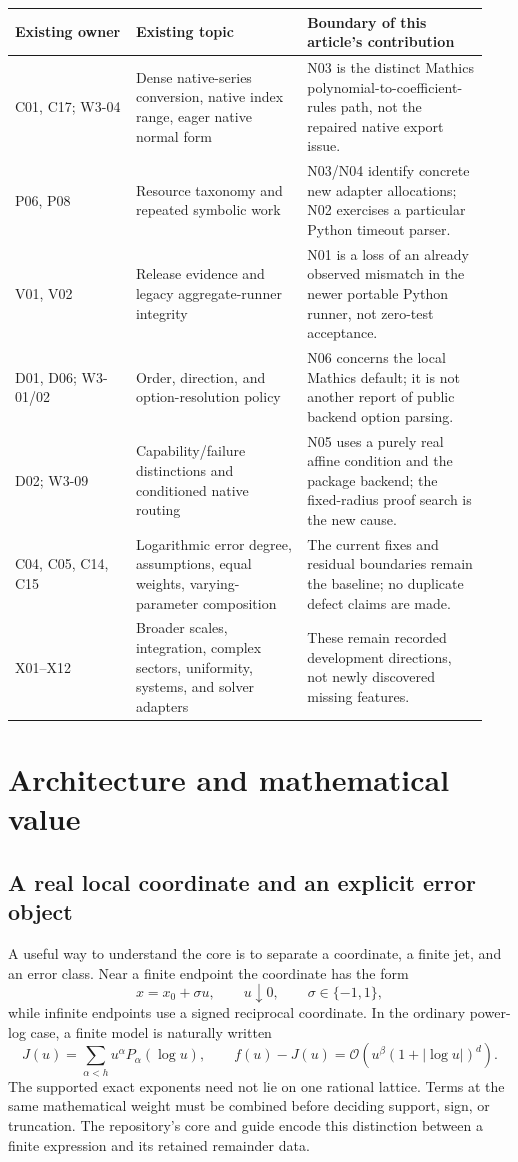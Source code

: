 \documentclass[11pt,a4paper]{article}
\newcommand{\code}[1]{\texttt{\detokenize{#1}}}
\newcommand{\OO}{\mathcal O}
\begin{document}
\begin{longtable}{@{}P{0.24\linewidth}P{0.34\linewidth}P{0.36\linewidth}@{}}
\toprule
Existing owner & Existing topic & Boundary of this article's contribution \\
\midrule
\endhead
C01, C17; W3-04 & Dense native-series conversion, native index range, eager native normal form & N03 is the distinct Mathics polynomial-to-coefficient-rules path, not the repaired native export issue. \\
P06, P08 & Resource taxonomy and repeated symbolic work & N03/N04 identify concrete new adapter allocations; N02 exercises a particular Python timeout parser. \\
V01, V02 & Release evidence and legacy aggregate-runner integrity & N01 is a loss of an already observed mismatch in the newer portable Python runner, not zero-test acceptance. \\
D01, D06; W3-01/02 & Order, direction, and option-resolution policy & N06 concerns the local Mathics \code{Limit} default; it is not another report of public backend option parsing. \\
D02; W3-09 & Capability/failure distinctions and conditioned native routing & N05 uses a purely real affine condition and the package backend; the fixed-radius proof search is the new cause. \\
C04, C05, C14, C15 & Logarithmic error degree, assumptions, equal weights, varying-parameter composition & The current fixes and residual boundaries remain the baseline; no duplicate defect claims are made. \\
X01--X12 & Broader scales, integration, complex sectors, uniformity, systems, and solver adapters & These remain recorded development directions, not newly discovered missing features. \\
\bottomrule
\end{longtable}

\section{Architecture and mathematical value}

\subsection{A real local coordinate and an explicit error object}

A useful way to understand the core is to separate a coordinate, a finite jet,
and an error class. Near a finite endpoint the coordinate has the form
\[
 x=x_0+\sigma u,\qquad u\downarrow0,\qquad \sigma\in\{-1,1\},
\]
while infinite endpoints use a signed reciprocal coordinate. In the ordinary
power-log case, a finite model is naturally written
\[
 J(u)=\sum_{\alpha<h}u^\alpha P_\alpha(\log u),
 \qquad
 f(u)-J(u)=\OO\!\left(u^\beta(1+|\log u|)^d\right).
\]
The supported exact exponents need not lie on one rational lattice. Terms at the
same mathematical weight must be combined before deciding support, sign, or
truncation. The repository's core and guide encode this distinction between a
finite expression and its retained remainder data. \cite{core,guide}
\end{document}
